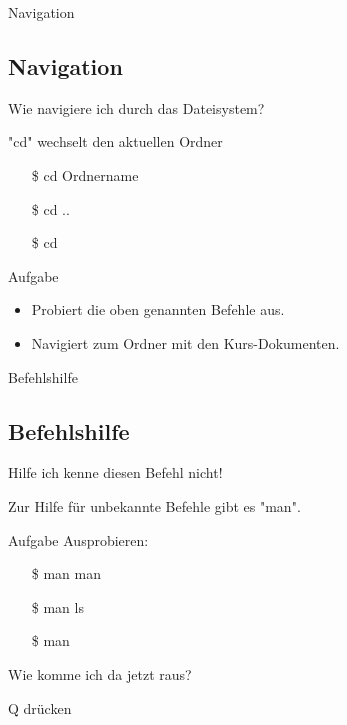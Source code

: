 \begin{frame}{Navigation}
    \subsection{Navigation}\label{subsec:navigation}

    Wie navigiere ich durch das Dateisystem?

    \textrightarrow "cd" wechselt den aktuellen Ordner

    \begin{itemize}
        \item[\$] cd Ordnername
        \item[\$] cd ..
        \item[\$] cd
    \end{itemize}

    \vspace{0.5cm}
    \begin{alertblock}{Aufgabe}
        \begin{itemize}
            \item Probiert die oben genannten Befehle aus.
            \item Navigiert zum Ordner mit den Kurs-Dokumenten.
        \end{itemize}
    \end{alertblock}

\end{frame}

\begin{frame}{Befehlshilfe}
    \subsection{Befehlshilfe}\label{subsec:befehlshilfe}

    Hilfe ich kenne diesen Befehl nicht!\pause

    \textrightarrow Zur Hilfe für unbekannte Befehle gibt es "man".

    \vspace{0.5cm}
    \begin{alertblock}{Aufgabe}
        Ausprobieren:

        \begin{itemize}
            \item[\$] man man
            \item[\$] man ls
            \item[\$] man
        \end{itemize}
    \end{alertblock}

    Wie komme ich da jetzt raus?

    \textrightarrow Q drücken

\end{frame}

